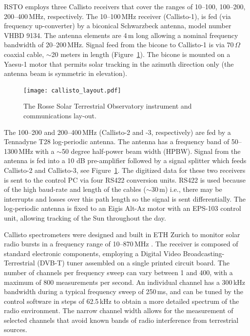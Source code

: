 RSTO employs three Callisto receivers that cover the ranges of 10--100, 100--200, 200--400\,MHz, respectively. The 10--100\,MHz receiver (Callisto-1), is fed (via frequency up-converter) by a biconical Schwarzbeck antenna, model number VHBD 9134. The antenna elements are 4\,m long allowing a nominal frequency bandwidth of 20--200\,MHz. Signal feed from the bicone to Callisto-1 is via $70\,\Omega$ coaxial cable, $\sim$20 meters in length (Figure~\ref{fig:rsto_layout}). The bicone is mounted on a Yaesu-1 motor that permits solar tracking in the azimuth direction only (the antenna beam is symmetric in elevation). 
\begin{figure}
    \centering
\texttt{[image: callisto\_layout.pdf]}
\caption[RSTO Instrumental Setup]{The Rosse Solar Terrestrial Observatory instrument and communications lay-out.}
\label{fig:rsto_layout}
\end{figure}

The 100--200 and 200--400\,MHz (Callisto-2 and -3, respectively) are fed by a Tennadyne T28 log-periodic antenna. The antenna has a frequency band of 50--1300\,MHz with a $\sim$50 degree half-power beam width (HPBW). Signal from the antenna is fed into a 10 dB pre-amplifier followed by a signal splitter which feeds Callisto-2 and Callisto-3, see Figure~\ref{fig:rsto_layout}. The digitized data for these two receivers is sent to the control PC via four RS422 conversion units. RS422 is used because of the high baud-rate and length of the cables ($\sim30$\,m) i.e., there may be interrupts and losses over this path length so the signal is sent differentially. The log-periodic antenna is fixed to an Eigis Alt-Az motor with an EPS-103 control unit, allowing tracking of the Sun throughout the day. 

Callisto spectrometers were designed and built in ETH Zurich to monitor solar radio bursts in a frequency range of 10--870\,MHz \citep{Benz2005}. The receiver is composed of standard electronic components, employing a Digital Video Broadcasting-Terrestrial (DVB-T) tuner assembled on a single printed circuit board. The number of channels per frequency sweep can vary between 1 and 400, with a maximum of 800 measurements per second. An individual channel has a 300\,kHz bandwidth during a typical frequency sweep of 250\,ms, and can be tuned by the control software in steps of 62.5\,kHz to obtain a more detailed spectrum of the radio environment. The narrow channel width allows for the measurement of selected channels that avoid known bands of radio interference from terrestrial sources.

